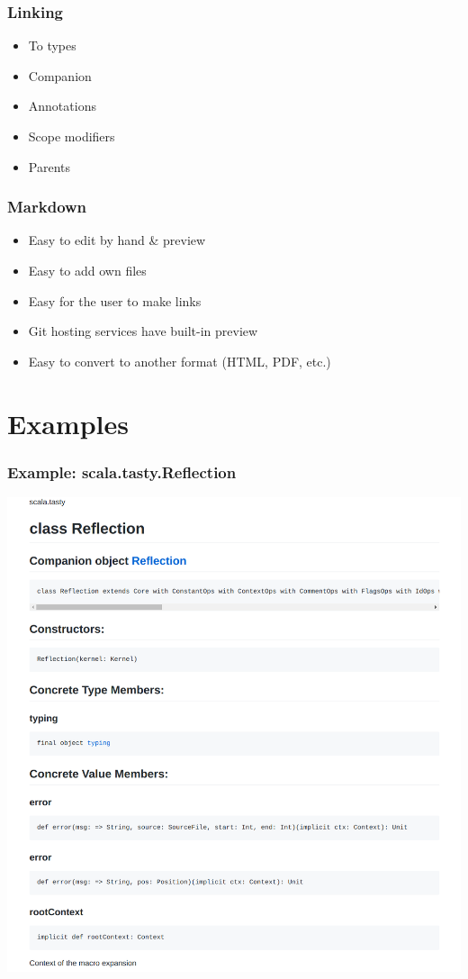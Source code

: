 \documentclass{beamer}
\begin{document}
\begin{frame}
  \frametitle{Linking}
  \pause
  \begin{itemize}
    \item To types \pause
    \item Companion \pause
    \item Annotations \pause
    \item Scope modifiers \pause
    \item Parents
  \end{itemize}
\end{frame}

\begin{frame}
  \frametitle{Markdown}
  \pause
  \begin{itemize}
    \item Easy to edit by hand \& preview \pause
    \item Easy to add own files \pause
    \item Easy for the user to make links \pause
    \item Git hosting services have built-in preview \pause
    \item Easy to convert to another format (HTML, PDF, etc.)
  \end{itemize}
\end{frame}

\section{Examples}

\begin{frame}
  \frametitle{Example: scala.tasty.Reflection}
  \begin{center}
    \includegraphics[width=\textwidth,height=0.9\textheight,keepaspectratio]{images/reflection.png}
  \end{center}
\end{frame}
\end{document}
